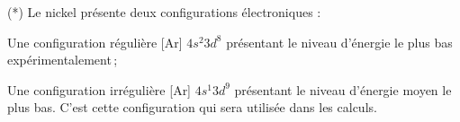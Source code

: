 \begin{table}[!h]
\begin{center}
\begin{threeparttable}
\begin{tabular}{r c l l l l}
\bottomrule

\end{tabular}
\begin{tablenotes}
    \item[(*)] Le nickel présente deux configurations électroniques :
    \begin{compactitemize}
    		\item Une configuration régulière [Ar] $4s^2 3d^8$ présentant le niveau d'énergie le plus bas expérimentalement\,;
    		\item Une configuration irrégulière [Ar] $4s^1 3d^9$ présentant le niveau d'énergie moyen le plus bas. C'est cette configuration qui sera utilisée dans les calculs. 
	\end{compactitemize}
\end{tablenotes}
\end{threeparttable}
\end{center}
\end{table}

%